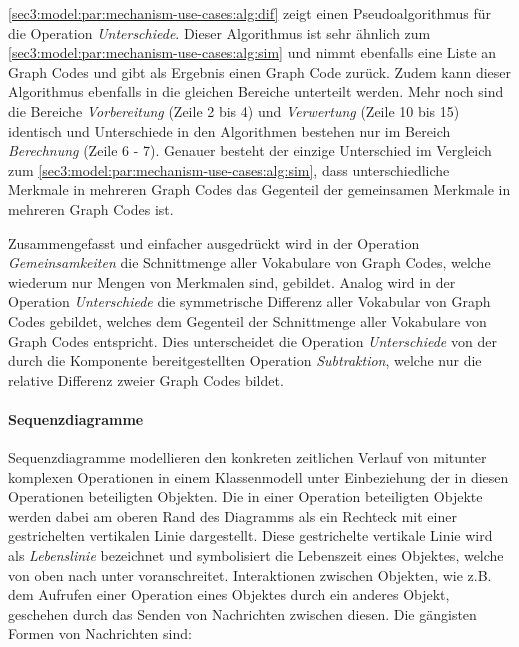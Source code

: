 

\cref{sec3:model:par:mechanism-use-cases:alg:dif} zeigt einen Pseudoalgorithmus für die Operation \textit{Unterschiede}.
Dieser Algorithmus ist sehr ähnlich zum \cref{sec3:model:par:mechanism-use-cases:alg:sim} und nimmt ebenfalls eine Liste an Graph Codes und gibt als Ergebnis einen Graph Code zurück.
Zudem kann dieser Algorithmus ebenfalls in die gleichen Bereiche unterteilt werden.
Mehr noch sind die Bereiche \textit{Vorbereitung} (Zeile 2 bis 4) und \textit{Verwertung} (Zeile 10 bis 15) identisch und Unterschiede in den Algorithmen bestehen nur im Bereich \textit{Berechnung} (Zeile 6 - 7).
Genauer besteht der einzige Unterschied im Vergleich zum \cref{sec3:model:par:mechanism-use-cases:alg:sim}, dass unterschiedliche Merkmale in mehreren Graph Codes das Gegenteil der gemeinsamen Merkmale in mehreren Graph Codes ist.

Zusammengefasst und einfacher ausgedrückt wird in der Operation \textit{Gemeinsamkeiten} die Schnittmenge aller Vokabulare von Graph Codes, welche wiederum nur Mengen von Merkmalen sind, gebildet.
Analog wird in der Operation \textit{Unterschiede} die symmetrische Differenz aller Vokabular von Graph Codes gebildet, welches dem Gegenteil der Schnittmenge aller Vokabulare von Graph Codes entspricht.
Dies unterscheidet die Operation \textit{Unterschiede} von der durch die Komponente bereitgestellten Operation \textit{Subtraktion}, welche nur die relative Differenz zweier Graph Codes bildet.


\FloatBarrier

\paragraph{Sequenzdiagramme}
\label{sec3:model:par:seq-use-cases}
Sequenzdiagramme modellieren den konkreten zeitlichen Verlauf von mitunter komplexen Operationen in einem Klassenmodell unter Einbeziehung der in diesen Operationen beteiligten Objekten.
Die in einer Operation beteiligten Objekte werden dabei am oberen Rand des Diagramms als ein Rechteck mit einer gestrichelten vertikalen Linie dargestellt.
Diese gestrichelte vertikale Linie wird als \textit{Lebenslinie} bezeichnet und symbolisiert die Lebenszeit eines Objektes, welche von oben nach unter voranschreitet.
Interaktionen zwischen Objekten, wie z.B. dem Aufrufen einer Operation eines Objektes durch ein anderes Objekt, geschehen durch das Senden von Nachrichten zwischen diesen.
Die gängisten Formen von Nachrichten sind:

